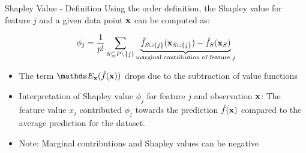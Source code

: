 \documentclass[11pt,compress,t,notes=noshow, aspectratio=169, xcolor=table]{beamer}
\begin{document}
\begin{frame}{Shapley Value - Definition  }
  Using the order definition, the Shapley value for feature $j$ and a given data point $\xv$ can be computed as:

     $$ \phi_j  = \frac{1}{p!} \sum_{S \subseteq P\setminus \{j\}} \underbrace{\fh_{\Scupj}(\xv_{\Scupj}) - \fh_{S}(\xv_{S})}_{\text{marginal contribution of feature $j$}} $$
\begin{itemize}
    \item The term $\E_{\xv}(\fh(\xv))$ drops due to the subtraction of value functions
  \item Interpretation of Shapley value $\phi_j$ for feature $j$ and observation $\xv$:
  The feature value $x_j$ contributed $\phi_j$ towards the prediction $\fh(\xv)$ compared to the average prediction for the dataset.
   \item Note: Marginal contributions and Shapley values can be negative
\end{itemize}
\lz

\end{frame}
\end{document}
